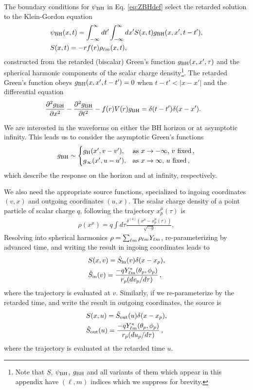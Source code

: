 \begin{refsection}
The boundary conditions for $\psi_{\rm BH}$ in Eq. \eqref{eq:ZBHdef} select the retarded solution to the Klein-Gordon equation
\begin{align}
&\psi_{\rm BH}(x,t)=\int_{-\infty}^{\infty}dt'\int_{-\infty}^{\infty}dx'S(x,t)g_{\rm BH}(x,x',t-t'), \nonumber \\
& S(x,t)=-rf(r)\rho_{\ell m}(x,t),
\end{align}
constructed from the retarded (biscalar) Green's function $g_{\rm BH}(x,x',\tau)$ and the spherical harmonic components of the scalar charge density\footnote{Note that $S$, $\psi_{\rm BH}$, $g_{\rm BH}$ and all variants of them which appear in this appendix have $(\ell,m)$ indices which we suppress for brevity.}. The retarded Green's function obeys $g_{\rm BH}(x,x',t-t')=0$ when $t-t'<|x-x'|$ and the differential equation
\begin{align}
&\frac{\partial^2g_{\rm BH}}{\partial x^2}-\frac{\partial^2g_{\rm BH}}{\partial t^2}-f(r)V(r)g_{\rm BH}=\delta(t-t')\delta(x-x'). \label{eq:gBHwave}
\end{align}

We are interested in the waveforms on either the BH horizon or at asymptotic infinity.
This leads us to consider the asymptotic Green's functions 
\begin{align}
g_{\rm BH} \sim
\begin{cases}
g_{\rm H}(x', v-v'), & \text{as } x \to -\infty,\, v\text{ fixed}\,,\\
g_\infty(x', u - u'), & \text{as } x \to \infty,\, u \text{ fixed}\,,
\end{cases}
\end{align}
which describe the response on the horizon and at infinity, respectively.

We also need the appropriate source functions, specialized to ingoing coordinates $(v,x)$ and outgoing coordinates $(u,x)$.
The scalar charge density of a point particle of scalar charge $q$, following the trajectory $x^\mu_p(\tau)$ is 
\begin{align}
\rho(x^\mu)=q\int d\tau \frac{\delta^{(4)}(x^\mu-x^\mu_p(\tau))}{\sqrt{-g}},
\end{align}
Resolving into spherical harmonics $\rho=\sum_{\ell m}\rho_{\ell m} Y_{\ell m}$, re-parameterizing by advanced time, and writing the result in ingoing coordinates leads to 
\begin{align}
&S(x,v)=\hat S_{\rm in}(v)\delta (x-x_p),\nonumber \\
& \hat S_{\rm in}(v)=\frac{-q Y_{\ell m}^*(\theta_p,\phi_p)}{r_p (dv_p/d\tau)}\,,
\end{align}
where the trajectory is evaluated at $v$. Similarly, if we re-parameterize by the retarded time, and write the result in outgoing coordinates, the source is
\begin{align}
&S(x,u)=\hat S_{\rm out}(u)\delta (x-x_p),\nonumber \\
& \hat S_{\rm out}(u)=\frac{-qY_{\ell m}^*(\theta_p,\phi_p)}{r_p (du_p/d\tau)} \,,
\end{align}
where the trajectory is evaluated at the retarded time $u$.


\end{refsection}
